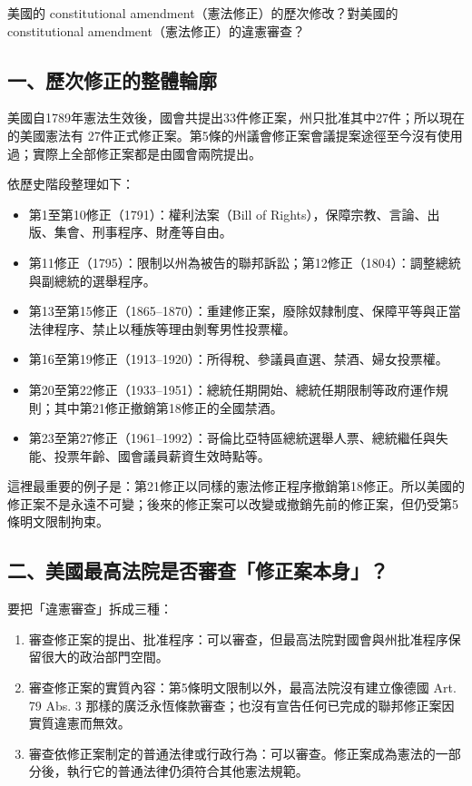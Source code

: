 
\begin{qaprompt}
美國的 constitutional amendment（憲法修正）的歷次修改？對美國的 constitutional amendment（憲法修正）的違憲審查？
\end{qaprompt}

\subsection{一、歷次修正的整體輪廓}

美國自1789年憲法生效後，國會共提出33件修正案，州只批准其中27件；所以現在的美國憲法有 27件正式修正案。第5條的州議會修正案會議提案途徑至今沒有使用過；實際上全部修正案都是由國會兩院提出。

依歷史階段整理如下：

\begin{itemize}
\tightlist
\item
  第1至第10修正（1791）：權利法案（Bill of Rights），保障宗教、言論、出版、集會、刑事程序、財產等自由。
\item
  第11修正（1795）：限制以州為被告的聯邦訴訟；第12修正（1804）：調整總統與副總統的選舉程序。
\item
  第13至第15修正（1865--1870）：重建修正案，廢除奴隸制度、保障平等與正當法律程序、禁止以種族等理由剝奪男性投票權。
\item
  第16至第19修正（1913--1920）：所得稅、參議員直選、禁酒、婦女投票權。
\item
  第20至第22修正（1933--1951）：總統任期開始、總統任期限制等政府運作規則；其中第21修正撤銷第18修正的全國禁酒。
\item
  第23至第27修正（1961--1992）：哥倫比亞特區總統選舉人票、總統繼任與失能、投票年齡、國會議員薪資生效時點等。
\end{itemize}

這裡最重要的例子是：第21修正以同樣的憲法修正程序撤銷第18修正。所以美國的修正案不是永遠不可變；後來的修正案可以改變或撤銷先前的修正案，但仍受第5條明文限制拘束。

\subsection{二、美國最高法院是否審查「修正案本身」？}

要把「違憲審查」拆成三種：

\begin{enumerate}
\def\labelenumi{\arabic{enumi}.}
\tightlist
\item
  審查修正案的提出、批准程序：可以審查，但最高法院對國會與州批准程序保留很大的政治部門空間。
\item
  審查修正案的實質內容：第5條明文限制以外，最高法院沒有建立像德國 Art. 79 Abs. 3 那樣的廣泛永恆條款審查；也沒有宣告任何已完成的聯邦修正案因實質違憲而無效。
\item
  審查依修正案制定的普通法律或行政行為：可以審查。修正案成為憲法的一部分後，執行它的普通法律仍須符合其他憲法規範。
\end{enumerate}

